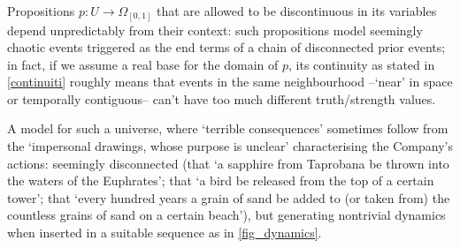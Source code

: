 \begin{example}\label{bli}
  Propositions $p : U \to \Omega_{[0,1]}$ that are allowed to be discontinuous in its variables depend unpredictably from their context: such propositions model seemingly chaotic events triggered as the end terms of a chain of disconnected prior events; in fact, if we assume a real base for the domain of $p$, its continuity as stated in \autoref{continuiti} roughly means that events in the same neighbourhood --`near' in space or temporally contiguous-- can't have too much different truth/strength values.

  A model for such a universe, where `terrible consequences' sometimes follow from the `impersonal drawings, whose purpose is unclear' characterising the Company's actions: seemingly disconnected (that `a sapphire from Taprobana be thrown into the waters of the Euphrates'; that `a bird be released from the top of a certain tower'; that `every hundred years a grain of sand be added to (or taken from) the countless grains of sand on a certain beach'), but generating nontrivial dynamics when inserted in a suitable sequence as in \autoref{fig_dynamics}.


\end{example}

